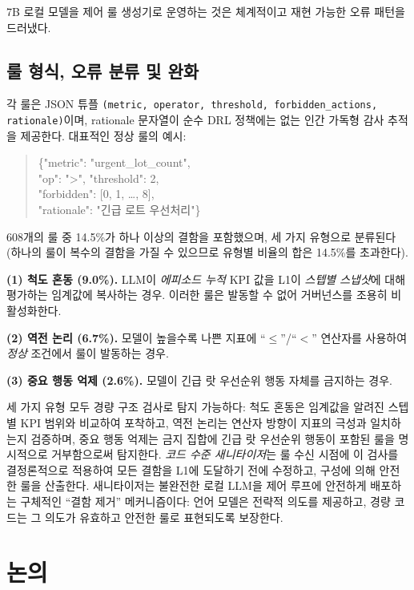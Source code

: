 \documentclass[10pt]{article}
\begin{document}
7B 로컬 모델을 제어 룰 생성기로 운영하는 것은 체계적이고 재현 가능한 오류
패턴을 드러냈다.

\subsection{룰 형식, 오류 분류 및 완화}
각 룰은 JSON 튜플 \texttt{(metric, operator, threshold,
forbidden\_actions, rationale)}이며, rationale 문자열이 순수 DRL
정책에는 없는 인간 가독형 감사 추적을 제공한다.
대표적인 정상 룰의 예시:
\begin{quote}
\footnotesize\ttfamily
\{"metric": "urgent\_lot\_count",\\
\phantom{\{}"op": "{>}", "threshold": 2,\\
\phantom{\{}"forbidden": [0, 1, \ldots, 8],\\
\phantom{\{}"rationale": "긴급 로트 우선처리"\}
\end{quote}

608개의 룰 중 14.5\%가 하나 이상의 결함을 포함했으며, 세 가지 유형으로 분류된다
(하나의 룰이 복수의 결함을 가질 수 있으므로 유형별 비율의 합은 14.5\%를 초과한다).

\noindent\textbf{(1) 척도 혼동 (9.0\%).} LLM이 \emph{에피소드 누적} KPI 값을
L1이 \emph{스텝별 스냅샷}에 대해 평가하는 임계값에 복사하는 경우.
이러한 룰은 발동할 수 없어 거버넌스를 조용히 비활성화한다.

\noindent\textbf{(2) 역전 논리 (6.7\%).} 모델이 높을수록 나쁜 지표에
``$\leq$''/``$<$'' 연산자를 사용하여 \emph{정상} 조건에서 룰이 발동하는 경우.

\noindent\textbf{(3) 중요 행동 억제 (2.6\%).} 모델이 긴급 랏 우선순위 행동
자체를 금지하는 경우.

세 가지 유형 모두 경량 구조 검사로 탐지 가능하다: 척도 혼동은 임계값을
알려진 스텝별 KPI 범위와 비교하여 포착하고, 역전 논리는 연산자 방향이
지표의 극성과 일치하는지 검증하며, 중요 행동 억제는 금지 집합에 긴급 랏
우선순위 행동이 포함된 룰을 명시적으로 거부함으로써 탐지한다.
\emph{코드 수준 새니타이저}는 룰 수신 시점에 이 검사를 결정론적으로
적용하여 모든 결함을 L1에 도달하기 전에 수정하고, 구성에 의해 안전한
룰을 산출한다. 새니타이저는 불완전한 로컬 LLM을 제어 루프에 안전하게
배포하는 구체적인 ``결함 제거'' 메커니즘이다: 언어 모델은 전략적 의도를
제공하고, 경량 코드는 그 의도가 유효하고 안전한 룰로 표현되도록 보장한다.


\section{논의}
\label{sec:discussion}
\end{document}
